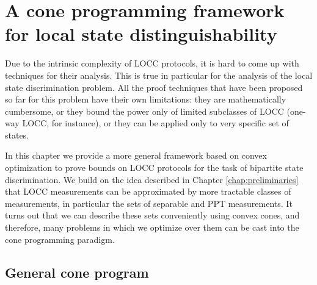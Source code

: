 \chapter{A cone programming framework for local state distinguishability}
\label{chap:programs}

Due to the intrinsic complexity of LOCC protocols, it is hard 
to come up with techniques for their analysis.
This is true in particular for the analysis of the local state discrimination 
problem. All the proof techniques that have been proposed so far for this problem 
have their own limitations: they are mathematically cumbersome, or they bound the 
power only of limited subclasses of LOCC (one-way LOCC, for instance), or they 
can be applied only to very specific set of states. 

In this chapter we provide a more general framework based on convex optimization 
to prove bounds on LOCC protocols for the task of bipartite state discrimination.
We build on the idea described in Chapter \ref{chap:preliminaries} that LOCC 
measurements can be approximated by more tractable classes of measurements, 
in particular the sets of separable and PPT measurements.
It turns out that we can describe these sets conveniently using convex cones, 
and therefore, many problems in which we optimize over them can be cast 
into the cone programming paradigm. 

\minitoc

\section{General cone program}

